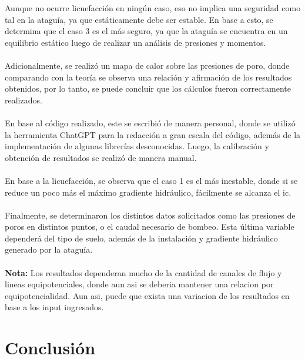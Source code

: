 Aunque no ocurre licuefacción en ningún caso, eso no implica una seguridad como tal en la ataguía, ya que estáticamente debe ser estable. En base a esto, se determina que el caso 3 es el más seguro, ya que la ataguía se encuentra en un equilibrio estático luego de realizar un análisis de presiones y momentos.
\\ \\
Adicionalmente, se realizó un mapa de calor sobre las presiones de poro, donde comparando con la teoría se observa una relación y afirmación de los resultados obtenidos, por lo tanto, se puede concluir que los cálculos fueron correctamente realizados.
\\ \\
En base al código realizado, este se escribió de manera personal, donde se utilizó la herramienta ChatGPT para la redacción a gran escala del código, además de la implementación de algunas librerías desconocidas. Luego, la calibración y obtención de resultados se realizó de manera manual.
\\ \\
En base a la licuefacción, se observa que el caso 1 es el más inestable, donde si se reduce un poco más el máximo gradiente hidráulico, fácilmente se alcanza el ic.
\\ \\
Finalmente, se determinaron los distintos datos solicitados como las presiones de poros en distintos puntos, o el caudal necesario de bombeo. Esta última variable dependerá del tipo de suelo, además de la instalación y gradiente hidráulico generado por la ataguía.
\\ \\
\textbf{Nota:} Los resultados dependeran mucho de la cantidad de canales de flujo y lineas equipotenciales, donde aun asi se deberia mantener una relacion por equipotencialidad. Aun asi, puede que exista una variacion de los resultados en base a los input ingresados.

\newpage
\section{Conclusión}

